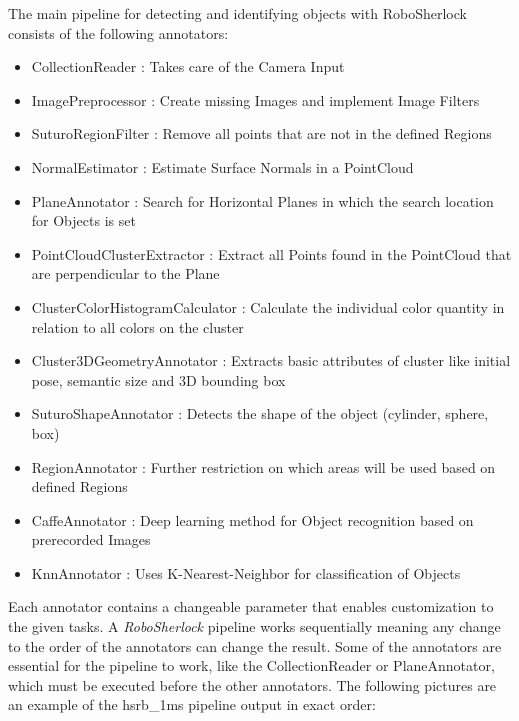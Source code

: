\documentclass[main.tex]{subfiles}
\begin{document}
The main pipeline for detecting and identifying objects with RoboSherlock consists of the following annotators:  
\begin{itemize}
	\item CollectionReader : Takes care of the Camera  Input
	\item ImagePreprocessor : Create missing Images and implement Image Filters  
	\item SuturoRegionFilter : Remove all points that are not in the defined Regions 
	\item NormalEstimator : Estimate Surface Normals in a PointCloud 
	\item PlaneAnnotator : Search for Horizontal Planes in which the search location for Objects is set
	\item PointCloudClusterExtractor : Extract all Points found in the PointCloud that are perpendicular to the Plane 
	\item ClusterColorHistogramCalculator : Calculate the individual color quantity in relation to all colors on the cluster   
	\item Cluster3DGeometryAnnotator : Extracts basic attributes of cluster like initial pose, semantic size and 3D bounding box 
	\item SuturoShapeAnnotator : Detects the shape of the object (cylinder, sphere, box)
	\item RegionAnnotator : Further restriction on which areas will be used based on defined Regions 
	\item CaffeAnnotator : Deep learning method for Object recognition based on prerecorded Images 
	\item KnnAnnotator : Uses K-Nearest-Neighbor for classification of Objects 
\end{itemize}

Each annotator contains a changeable parameter that enables customization to the given tasks.
A \textit{RoboSherlock} pipeline works sequentially meaning any change to the order of the annotators can change the result. Some of the annotators are essential for the pipeline to work, like the CollectionReader or PlaneAnnotator, which must be executed before the other annotators. 
The following pictures are an example of the hsrb\_1ms pipeline output in exact order:  \\
\end{document}
